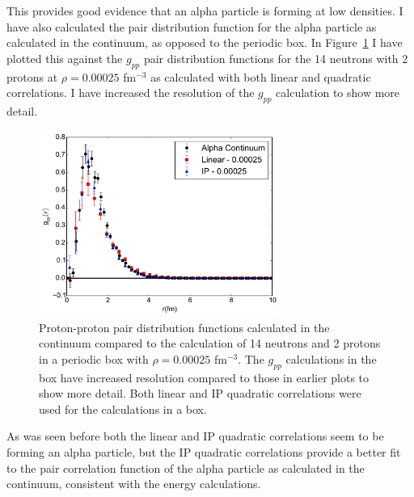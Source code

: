 This provides good evidence that an alpha particle is forming at low densities. I have also calculated the pair distribution function for the alpha particle as calculated in the continuum, as opposed to the periodic box. In Figure~\ref{fig:gpp_compare} I have plotted this against the $g_{pp}$ pair distribution functions for the 14 neutrons with 2 protons at $\rho=0.00025$ fm$^{-3}$ as calculated with both linear and quadratic correlations. I have increased the resolution of the $g_{pp}$ calculation to show more detail.
\begin{figure}[h!]
   \centering
   \includegraphics[width=0.7\textwidth]{figures/gpp_compare.pdf}
   \caption[Proton-proton Pair Distribution Functions Calculated in the Continuum Compared to the Calculation of 14 Neutrons and 2 Protons in a Periodic Box with $\rho=0.00025$ fm$^{-3}$. The $g_{pp}$ Calculations in the Box Have Increased Resolution Compared to Those in Earlier Plots to Show More Detail. Both Linear and IP Quadratic Correlations Were Used for the Calculations in a Box.]{Proton-proton pair distribution functions calculated in the continuum compared to the calculation of 14 neutrons and 2 protons in a periodic box with $\rho=0.00025$ fm$^{-3}$. The $g_{pp}$ calculations in the box have increased resolution compared to those in earlier plots to show more detail. Both linear and IP quadratic correlations were used for the calculations in a box.}
   \label{fig:gpp_compare}
\end{figure}
As was seen before both the linear and IP quadratic correlations seem to be forming an alpha particle, but the IP quadratic correlations provide a better fit to the pair correlation function of the alpha particle as calculated in the continuum, consistent with the energy calculations.

